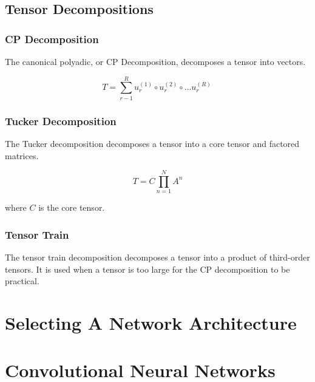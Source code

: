 \documentclass{article}
\begin{document}
\subsection{Tensor Decompositions}


\subsubsection{CP Decomposition}

The canonical polyadic, or CP Decomposition, decomposes a tensor into vectors.

\begin{equation}
    T = \sum_{r-1}^R u_r^{(1)} \circ  u_r^{(2)} \circ \dots  u_r^{(R)}\
    \label{CP}
\end{equation} %


\subsubsection{Tucker Decomposition}

The Tucker decomposition decomposes a tensor into a core tensor and factored matrices. %

\begin{equation}
    T = C\prod_{n=1}^N A^n
    \label{Tucker}
\end{equation} %

where \(C\) is the core tensor.


\subsubsection{Tensor Train}

The tensor train decomposition decomposes a tensor into a product of third-order tensors. It is used when a tensor is too large for the CP decomposition to be practical. 


\section{Selecting A Network Architecture}

\section{Convolutional Neural Networks}
\end{document}

